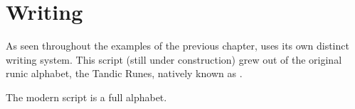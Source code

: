 \chapter{Writing}

As seen throughout the examples of the previous chapter, \lang{} uses its own distinct writing system. This script (still under construction) grew out of the original runic alphabet, the Tandic Runes, natively known as   .

The modern \lang{} script is a full alphabet.\autocite{wals-141}